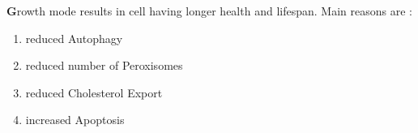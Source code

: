 \textbf Growth mode results in cell having longer health and lifespan. Main reasons are :
\begin{enumerate}
\item reduced Autophagy
\item reduced number of Peroxisomes 
\item reduced Cholesterol Export
\item increased Apoptosis
\end{enumerate}